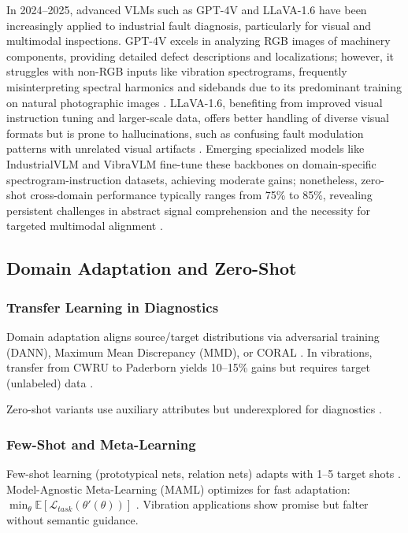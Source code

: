In 2024--2025, advanced VLMs such as GPT-4V and LLaVA-1.6 have been increasingly applied to industrial fault diagnosis, particularly for visual and multimodal inspections. GPT-4V excels in analyzing RGB images of machinery components, providing detailed defect descriptions and localizations; however, it struggles with non-RGB inputs like vibration spectrograms, frequently misinterpreting spectral harmonics and sidebands due to its predominant training on natural photographic images \cite{openai2024gpt4v}. LLaVA-1.6, benefiting from improved visual instruction tuning and larger-scale data, offers better handling of diverse visual formats but is prone to hallucinations, such as confusing fault modulation patterns with unrelated visual artifacts \cite{liu2024llava}. Emerging specialized models like IndustrialVLM and VibraVLM fine-tune these backbones on domain-specific spectrogram-instruction datasets, achieving moderate gains; nonetheless, zero-shot cross-domain performance typically ranges from 75\% to 85\%, revealing persistent challenges in abstract signal comprehension and the necessity for targeted multimodal alignment \cite{zhang2025industrialvlm,liu2025vibravlm}.

\subsection{Domain Adaptation and Zero-Shot}
\subsubsection{Transfer Learning in Diagnostics}
Domain adaptation aligns source/target distributions via adversarial training (DANN), Maximum Mean Discrepancy (MMD), or CORAL \cite{qiao2022grl,li2021mmd,wen2020domain}. In vibrations, transfer from CWRU to Paderborn yields 10--15\% gains but requires target (unlabeled) data \cite{wang2020transfer}.

Zero-shot variants use auxiliary attributes but underexplored for diagnostics \cite{chen2023gzsl}.

\subsubsection{Few-Shot and Meta-Learning}
Few-shot learning (prototypical nets, relation nets) adapts with 1--5 target shots \cite{hoang2023vit}. Model-Agnostic Meta-Learning (MAML) optimizes for fast adaptation: $\min_\theta \mathbb{E} [\mathcal{L}_{task}(\theta'(\theta))]$ \cite{wen2022maml}. Vibration applications show promise but falter without semantic guidance.

